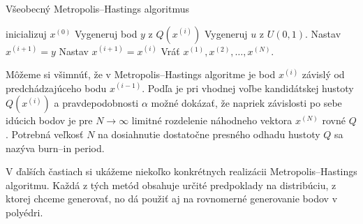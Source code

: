 \begin{algorithm}[H]
	\caption{Všeobecný Metropolis--Hastings algoritmus \cite{metropolis-hastings_chib}}
	\label{metropolis-hastings}
	\begin{algorithmic}[1]
		\State inicializuj $x^{(0)}$
			\State Vygeneruj bod $y$ z $Q(x^{(i)})$
			\State Vygeneruj $u$ z $U(0,1)$.
				\State Nastav $x^{(i+1)}=y$
			\Else
				\State Nastav $x^{(i+1)}=x^{(i)}$
			\EndIf
		\EndFor
		\State Vráť ${x^{(1)},x^{(2)},\dots,x^{(N)}}$.
	\end{algorithmic}
\end{algorithm}

Môžeme si všimnúť, že v Metropolis--Hastings algoritme je bod $x^{(i)}$ závislý od predchádzajúceho bodu $x^{(i-1)}$. Podľa \cite{metropolis-hastings_chib} je pri vhodnej voľbe kandidátskej hustoty $Q(x^{(i)})$ a pravdepodobnosti $\alpha$ možné dokázať, že napriek závislosti po sebe idúcich bodov je pre $N \rightarrow \infty$ limitné rozdelenie náhodneho vektora $x^{(N)}$ rovné $Q$. Potrebná veľkosť $N$ na dosiahnutie dostatočne presného odhadu hustoty $Q$ sa nazýva burn--in period.

V ďalších častiach si ukážeme niekoľko konkrétnych realizácii Metropolis--Hastings algoritmu. Každá z tých metód obsahuje určité predpoklady na distribúciu, z ktorej chceme generovať, no dá použiť aj na rovnomerné generovanie bodov v polyédri.